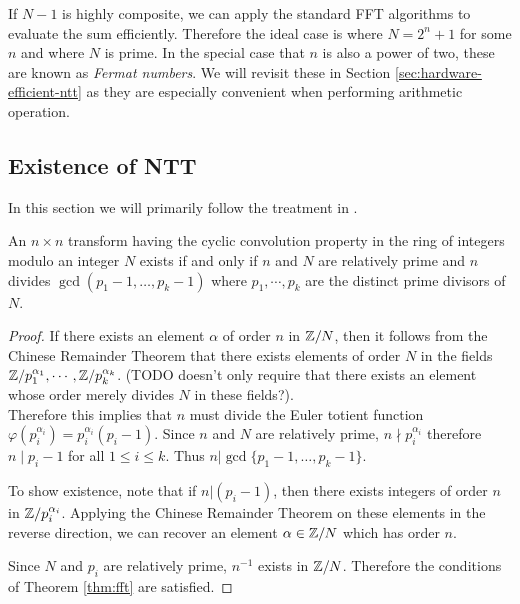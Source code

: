 If $N - 1$ is highly composite, we can apply the standard FFT algorithms to evaluate the sum efficiently. Therefore the ideal case is where $N = 2^n + 1$ for some $n$ and where $N$ is prime. In the special case that $n$ is also a power of two, these are known as \emph{Fermat numbers}. We will revisit these in Section \ref{sec:hardware-efficient-ntt} as they are especially convenient when performing arithmetic operation.

\subsection{Existence of NTT}%
\label{sub:Existence of NTT}

In this section we will primarily follow the treatment in \cite{intro-to-fmt}.

\begin{theorem}\label{thm:fmt-transform-length}
    An $n \times n$ transform having the cyclic convolution property in the ring of integers modulo an integer $N$ exists if and only if $n$ and $N$ are relatively prime and $n$ divides $\gcd(p_1 - 1, \ldots, p_k - 1)$ where $p_1, \cdots, p_k$ are the distinct prime divisors of $N$.
\end{theorem}

\begin{proof}
    If there exists an element $\alpha$ of order $n$ in ${\mathbb Z}/N$, then it follows from the Chinese Remainder Theorem that there exists elements of order $N$ in the fields ${\mathbb Z}/p_1^{\alpha_1}, \cdots, {\mathbb Z}/p_k^{\alpha_k}$. (TODO doesn't only require that there exists an element whose order merely divides $N$ in these fields?).\\
    Therefore this implies that $n$ must divide the Euler totient function $\varphi(p_i^{\alpha_i}) = p_i^{\alpha_i}(p_i - 1)$. Since $n$ and $N$ are relatively prime, $n \nmid p_i^{\alpha_i}$ therefore $n \mid p_i - 1$ for all $1 \le i \le k$. Thus $n | \gcd\{p_1 - 1, \ldots, p_k - 1\}$.

    \medskip

    To show existence, note that if $n | (p_i - 1)$, then there exists integers of order $n$ in ${\mathbb Z}/p_i^{\alpha_i}$. Applying the Chinese Remainder Theorem on these elements in the reverse direction, we can recover an element $\alpha \in {\mathbb Z}/N$ which has order $n$.

    \medskip

    Since $N$ and $p_i$ are relatively prime, $n^{-1}$ exists in ${\mathbb Z}/N$. Therefore the conditions of Theorem \ref{thm:fft} are satisfied.
\end{proof}

